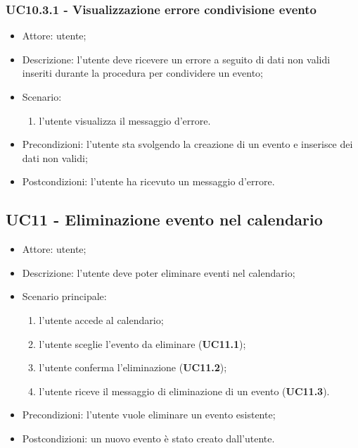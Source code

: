 \subsubsection{UC10.3.1 - Visualizzazione errore condivisione evento}
\begin{itemize}
    \item Attore: utente;
    \item Descrizione: l'utente deve ricevere un errore a seguito di dati non validi inseriti durante la procedura per condividere un evento;
    \item Scenario:
        \begin{enumerate}
        \item l'utente visualizza il messaggio d'errore.
        \end{enumerate}
    
    \item Precondizioni: l'utente sta svolgendo la creazione di un evento e inserisce dei dati non validi;
    \item Postcondizioni: l'utente ha ricevuto un messaggio d'errore.
\end{itemize}


\subsection{UC11 - Eliminazione evento nel calendario}
\begin{itemize}
    \item Attore: utente;
    \item Descrizione: l'utente deve poter eliminare eventi nel calendario;
    \item Scenario principale:
        \begin{enumerate}
        \item l'utente accede al calendario;
        \item l'utente sceglie l'evento da eliminare (\textbf{UC11.1});
        \item l'utente conferma l'eliminazione (\textbf{UC11.2});
        \item l'utente riceve il messaggio di eliminazione di un evento (\textbf{UC11.3}).
        \end{enumerate}
    \item Precondizioni: l'utente vuole eliminare un evento esistente;
    \item Postcondizioni: un nuovo evento è stato creato dall'utente.
\end{itemize}

